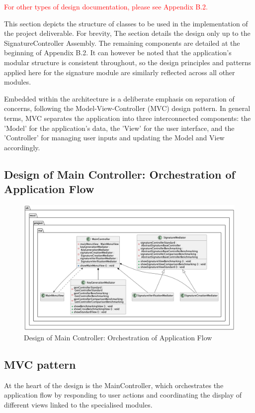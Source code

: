 \documentclass[]{final_report}
\theoremstyle{definition}
\begin{document}
\textcolor{red} {For other types of design documentation, please see Appendix B.2.}

This section depicts the structure of classes to be used in the implementation of the project deliverable. For brevity, The section details the design only up to the SignatureController Assembly. The remaining components are detailed at the beginning of Appendix B.2. It can however be noted that the application's modular structure is consistent throughout, so the design principles and patterns applied here for the signature module are similarly reflected across all other modules. 

Embedded within the architecture is a deliberate emphasis on separation of concerns, following the Model-View-Controller (MVC) design pattern. In general terms, MVC separates the application into three interconnected components: the 'Model' for the application's data, the 'View' for the user interface, and the 'Controller' for managing user inputs and updating the Model and View accordingly.
\subsection{Design of Main Controller: Orchestration of Application Flow}


\begin{figure}[H]
    \centering
    \includegraphics[width=\textwidth]{main_pictures/mainController.png}
    \caption{Design of Main Controller: Orchestration of Application Flow}
    \label{fig:MAINCONTROLLERDESIGN}
\end{figure}


\subsection{MVC pattern}
At the heart of the design is the MainController, which orchestrates the application flow by responding to user actions and coordinating the display of different views linked to the specialised modules. 
\end{document}
